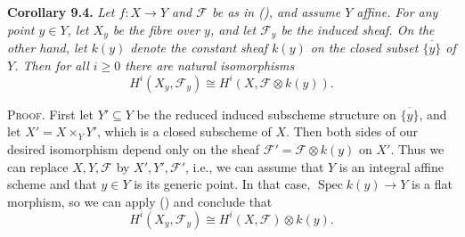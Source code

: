 {\medskip
\noindent\hypertarget{result-III-9.4}{}\textbf{Corollary 9.4.} \emph{Let $f\colon X\to Y$ and $\mathcal F$ be as in (), and assume $Y$ affine. For any point $y\in Y$, let $X_y$ be the fibre over $y$, and let $\mathcal F_y$ be the induced sheaf. On the other hand, let $k(y)$ denote the constant sheaf $k(y)$ on the closed subset $\overline{\{y\}}$ of $Y$. Then for all $i\ge0$ there are natural isomorphisms}
\[
H^i(X_y,\mathcal F_y)\cong H^i(X,\mathcal F\otimes k(y)).
\]

\smallskip
\noindent\textsc{Proof.} First let $Y'\subseteq Y$ be the reduced induced subscheme structure on $\overline{\{y\}}$, and let $X'=X\times_Y Y'$, which is a closed subscheme of $X$. Then both sides of our desired isomorphism depend only on the sheaf $\mathcal F'=\mathcal F\otimes k(y)$ on $X'$. Thus we can replace $X,Y,\mathcal F$ by $X',Y',\mathcal F'$, i.e., we can assume that $Y$ is an integral affine scheme and that $y\in Y$ is its generic point. In that case, $\operatorname{Spec}k(y)\to Y$ is a flat morphism, so we can apply () and conclude that
\[
H^i(X_y,\mathcal F_y)\cong H^i(X,\mathcal F)\otimes k(y).
\]}
